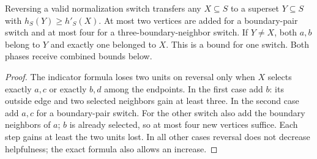 \begin{theorem}
  \label{thm:lowerbounds-algebraic-edge-switch-restoration}
  \leanok
  Reversing a valid normalization switch transfers any $X\subseteq S$
  to a superset $Y\subseteq S$ with $h_S(Y)\ge h'_S(X)$. At most two
  vertices are added for a boundary-pair switch and at most four for a
  three-boundary-neighbor switch. If $Y\ne X$, both $a,b$ belong to $Y$
  and exactly one belonged to $X$.
  This is a bound for one switch. Both phases receive combined bounds below.
\end{theorem}
\begin{proof}
  \leanok
  The indicator formula loses two units on reversal only when $X$
  selects exactly $a,c$ or exactly $b,d$ among the endpoints. In the first
  case add $b$: its outside edge and two selected neighbors gain at
  least three. In the second case add $a,c$ for a boundary-pair switch.
  For the other switch also add the boundary neighbors of $a$; $b$ is
  already selected, so at most four new vertices suffice. Each step gains
  at least the two units lost. In all other cases reversal does not
  decrease helpfulness; the exact formula also allows an increase.
\end{proof}

